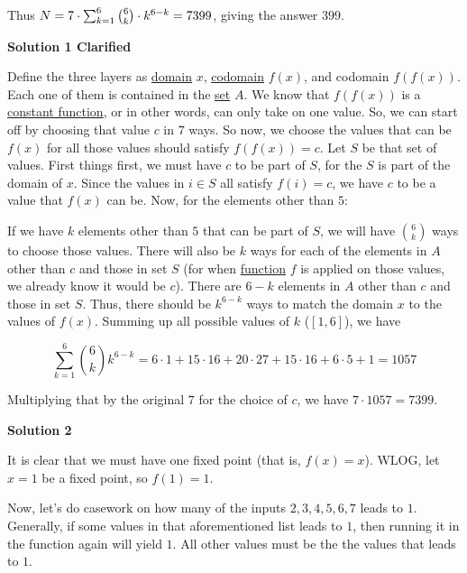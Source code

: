 \begin{enumerate}
 Thus $N=7\cdot\sum_{k=1}^6\tbinom6k\cdot k^{6-k}=7399$, giving the answer $\boxed{399}$.

 



\textbf{Solution 1 Clarified}

Define the three layers as \href{https://artofproblemsolving.com/wiki/index.php?title=Domain}{domain} $x$, \href{https://artofproblemsolving.com/wiki/index.php?title=Codomain}{codomain} $f(x)$, and codomain $f(f(x))$. Each one of them is contained in the \href{https://artofproblemsolving.com/wiki/index.php?title=Set}{set} $A$. We know that $f(f(x))$ is a \href{https://artofproblemsolving.com/wiki/index.php?title=Constant\_function}{constant function}, or in other words, can only take on one value. So, we can start off by choosing that value $c$ in $7$ ways. So now, we choose the values that can be $f(x)$ for all those values should satisfy $f(f(x))=c$. Let $S$ be that set of values. First things first, we must have $c$ to be part of $S$, for the $S$ is part of the domain of $x$. Since the values in $i\in S$ all satisfy $f(i) = c$, we have $c$ to be a value that $f(x)$ can be. Now, for the elements other than $5$:

 If we have $k$ elements other than $5$ that can be part of $S$, we will have $\binom{6}{k}$ ways to choose those values. There will also be $k$ ways for each of the elements in $A$ other than $c$ and those in set $S$ (for when \href{https://artofproblemsolving.com/wiki/index.php?title=Function}{function} $f$ is applied on those values, we already know it would be $c$). There are $6-k$ elements in $A$ other than $c$ and those in set $S$. Thus, there should be $k^{6-k}$ ways to match the domain $x$ to the values of $f(x)$. Summing up all possible values of $k$ ($[1,6]$), we have

 
 \[\sum_{k=1}^6 \binom{6}{k} k^{6-k} = 6\cdot 1 + 15\cdot 16 + 20\cdot 27 + 15\cdot 16 + 6\cdot 5 + 1 = 1057\]

 Multiplying that by the original $7$ for the choice of $c$, we have $7 \cdot 1057 = 7\boxed{399}.$




\textbf{Solution 2}

It is clear that we must have one fixed point (that is, $f(x)=x$). WLOG, let $x=1$ be a fixed point, so $f(1)=1$. 

 Now, let's do casework on how many of the inputs $2, 3, 4, 5, 6 ,7$ leads to $1$. Generally, if some values in that aforementioned list leads to $1$, then running it in the function again will yield $1$. All other values must be the the values that leads to $1$. 


\end{enumerate}
